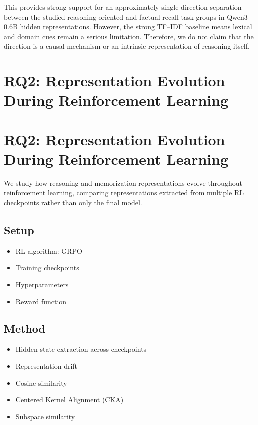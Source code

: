 \documentclass[11pt]{article}
\begin{document}
This provides strong support for an approximately single-direction separation between the studied reasoning-oriented and factual-recall task groups in Qwen3-0.6B hidden representations. However, the strong TF--IDF baseline means lexical and domain cues remain a serious limitation. Therefore, we do not claim that the direction is a causal mechanism or an intrinsic representation of reasoning itself.

\section{RQ2: Representation Evolution During Reinforcement Learning}\section{RQ2: Representation Evolution During Reinforcement Learning}

We study how reasoning and memorization representations evolve
throughout reinforcement learning, comparing representations extracted
from multiple RL checkpoints rather than only the final model.

\subsection{Setup}

\begin{itemize}

    \item RL algorithm: GRPO
    \item Training checkpoints
    \item Hyperparameters
    \item Reward function

\end{itemize}

\subsection{Method}

\begin{itemize}

    \item Hidden-state extraction across checkpoints
    \item Representation drift
    \item Cosine similarity
    \item Centered Kernel Alignment (CKA)
    \item Subspace similarity

\end{itemize}
\end{document}
